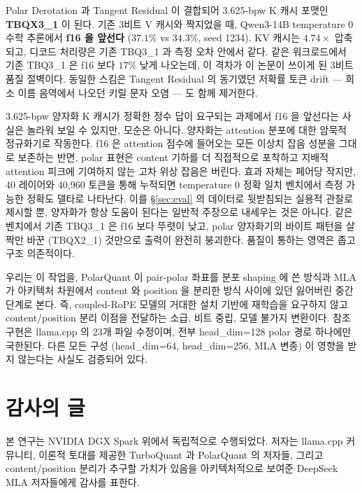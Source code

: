 \documentclass[10pt,twocolumn]{article}
\begin{document}
Polar Derotation 과 Tangent Residual 이 결합되어 3.625-bpw K 캐시 포맷인 \textbf{TBQX3\_1} 이 된다. 기존 3비트 V 캐시와 짝지었을 때, Qwen3-14B temperature $0$ 수학 추론에서 \textbf{f16 을 앞선다} ($37.1\%$ vs $34.3\%$, seed 1234). KV 캐시는 $4.74\times$ 압축되고, 디코드 처리량은 기존 TBQ3\_1 과 측정 오차 안에서 같다. 같은 워크로드에서 기존 TBQ3\_1 은 f16 보다 $17\%$ 낮게 나오는데, 이 격차가 이 논문이 쓰이게 된 3비트 품질 절벽이다. 동일한 스킴은 Tangent Residual 의 동기였던 저확률 토큰 drift --- 희소 이름 음역에서 나오던 키릴 문자 오염 --- 도 함께 제거한다.

3.625-bpw 양자화 K 캐시가 정확한 정수 답이 요구되는 과제에서 f16 을 앞선다는 사실은 놀라워 보일 수 있지만, 모순은 아니다. 양자화는 attention 분포에 대한 암묵적 정규화기로 작동한다. f16 은 attention 점수에 들어오는 모든 이상치 잡음 성분을 그대로 보존하는 반면, polar 표현은 content 기하를 더 직접적으로 포착하고 지배적 attention 피크에 기여하지 않는 고차 위상 잡음은 버린다. 효과 자체는 페어당 작지만, 40 레이어와 40,960 토큰을 통해 누적되면 temperature $0$ 정확 일치 벤치에서 측정 가능한 정확도 델타로 나타난다. 이를 \S\ref{sec:eval} 의 데이터로 뒷받침되는 실용적 관찰로 제시할 뿐, 양자화가 항상 도움이 된다는 일반적 주장으로 내세우는 것은 아니다. 같은 벤치에서 기존 TBQ3\_1 은 f16 보다 뚜렷이 낮고, polar 양자화기의 바이트 패턴을 살짝만 바꾼 (TBQX2\_1) 것만으로 출력이 완전히 붕괴한다. 품질이 통하는 영역은 좁고 구조 의존적이다.

우리는 이 작업을, PolarQuant 이 pair-polar 좌표를 분포 shaping 에 쓴 방식과 MLA 가 아키텍처 차원에서 content 와 position 을 분리한 방식 사이에 있던 잃어버린 중간 단계로 본다. 즉, coupled-RoPE 모델의 거대한 설치 기반에 재학습을 요구하지 않고 content/position 분리 이점을 전달하는 소급, 비트 중립, 모델 불가지 변환이다. 참조 구현은 llama.cpp 의 23개 파일 수정이며, 전부 head\_dim=128 polar 경로 하나에만 국한된다. 다른 모든 구성 (head\_dim=64, head\_dim=256, MLA 변종) 이 영향을 받지 않는다는 사실도 검증되어 있다.

\section*{감사의 글}

본 연구는 NVIDIA DGX Spark 위에서 독립적으로 수행되었다. 저자는 llama.cpp 커뮤니티, 이론적 토대를 제공한 TurboQuant 과 PolarQuant 의 저자들, 그리고 content/position 분리가 추구할 가치가 있음을 아키텍처적으로 보여준 DeepSeek MLA 저자들에게 감사를 표한다.
\end{document}
